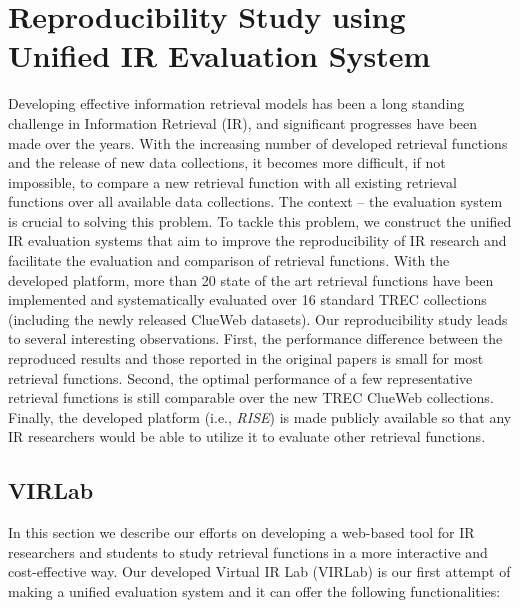 \chapter{Reproducibility Study using Unified IR Evaluation System}

Developing effective information retrieval models has been a 
long standing challenge in Information Retrieval (IR), and significant 
progresses have been made over the years. With the increasing 
number of developed retrieval functions and the release of 
new data collections, it becomes more difficult, if not impossible, 
to compare a new retrieval function with all existing retrieval 
functions over all available data collections.  
The context -- the evaluation system is crucial to solving this problem.
To tackle this problem, we construct the unified IR evaluation systems 
that aim to improve the reproducibility of IR research
and facilitate the evaluation and comparison of retrieval functions. 
With the developed platform, more than 20 state of the art 
retrieval functions have been implemented and systematically 
evaluated over 16 standard TREC collections (including the newly 
released ClueWeb datasets). Our reproducibility study leads to 
several interesting observations. First, the performance difference
between the reproduced results and those reported in the original 
papers is small for most retrieval functions.  Second, the optimal 
performance of a few representative retrieval functions is still 
comparable over the new TREC ClueWeb collections. 
Finally, the developed platform (i.e., {\em RISE}) is made publicly 
available so that any IR researchers would be able to utilize 
it to evaluate other retrieval functions. 


\section{VIRLab}

In this section we describe our efforts on developing a web-based
tool for IR researchers and students to study retrieval functions 
in a more interactive and cost-effective way. 
Our developed Virtual IR Lab (VIRLab) is our first attempt of making 
a unified evaluation system and it can offer the following functionalities:

